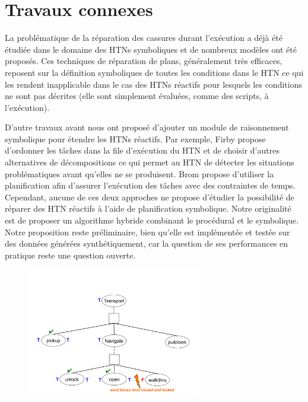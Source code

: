 \documentclass[a4paper,twoside,french]{article}
\begin{document}
				\section{Travaux connexes}
				La problématique de la réparation des cassures durant l'exécution a déjà été étudiée dans le domaine des HTNs symboliques et de nombreux modèles ont été proposés\cite{boella2002replanning,van2005plan,ayan2007hotride,warfield2007adaptation}. Ces techniques de réparation de plans, généralement très efficaces, reposent sur la définition symboliques de toutes les conditions dans le HTN ce qui les rendent inapplicable dans le cas des HTNs réactifs pour lesquels les conditions ne sont pas décrites (elle sont simplement évaluées, comme des scripts, à l'exécution).
				\par D'autre travaux avant nous ont proposé d'ajouter un module de raisonnement symbolique pour étendre les HTNs réactifs. Par exemple, Firby \cite{firby1987investigation} propose d'ordonner les tâches dans la file d'exécution du HTN et de choisir d'autres alternatives de décompositions ce qui permet au HTN de détecter les situations problématiques avant qu'elles ne se produisent. Brom \cite{brom2005hierarchical} propose d'utiliser la planification afin d'assurer l'exécution des tâches avec des contraintes de temps. Cependant, aucune de ces deux approches ne propose d'étudier la possibilité de réparer des HTN réactifs à l'aide de planification symbolique. Notre originalité est de proposer un algorithme hybride combinant le procédural et le symbolique. Notre proposition reste préliminaire, bien qu'elle est implémentée et testée sur des données générées synthétiquement, car la question de ses performances en pratique reste une question ouverte. 
				\begin{figure}[t]
					\centerline{\includegraphics[width=3in]{figs/wind}}
					\vskip 8pt
				\end{figure}
	
\end{document}
